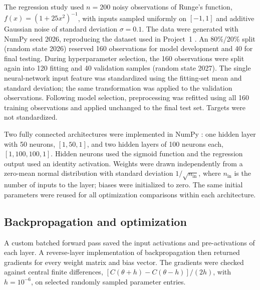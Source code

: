 \documentclass[aps,rmp,reprint,amsmath,amssymb,graphicx,longbibliography]{revtex4-1}
\begin{document}
The regression study used $n=200$ noisy observations of Runge's function,
$f(x)=(1+25x^2)^{-1}$, with inputs sampled uniformly on $[-1,1]$ and
additive Gaussian noise of standard deviation $\sigma=0.1$. The data
were generated with NumPy \cite{harris2020array} seed 2026, reproducing the dataset used in
Project~1 \cite{Project_1}. An 80\%/20\% split (random state 2026) reserved 160
observations for model development and 40 for final testing. During
hyperparameter selection, the 160 observations were split again into
120 fitting and 40 validation samples (random state 2027). The single
neural-network input feature was standardized using the fitting-set mean
and standard deviation; the same transformation was applied to the
validation observations. Following model selection, preprocessing was
refitted using all 160 training observations and applied unchanged to
the final test set. Targets were not standardized.

Two fully connected architectures were implemented in NumPy \cite{harris2020array}: one hidden
layer with 50 neurons, $[1,50,1]$, and two hidden layers of 100 neurons
each, $[1,100,100,1]$. Hidden neurons used the sigmoid function and the
regression output used an identity activation.
Weights were drawn independently from a zero-mean normal distribution
with standard deviation $1/\sqrt{n_{\mathrm{in}}}$, where
$n_{\mathrm{in}}$ is the number of inputs to the layer; biases were
initialized to zero. The same initial parameters were reused for all
optimization comparisons within each architecture.


\subsection{Backpropagation and optimization}
\label{subsec:partb_optimization}

A custom batched forward pass saved the input activations and
pre-activations of each layer. A reverse-layer implementation of
backpropagation then returned gradients for every weight matrix and
bias vector. The gradients were checked against central finite
differences, $[C(\theta+h)-C(\theta-h)]/(2h)$, with $h=10^{-6}$, on
selected randomly sampled parameter entries.
\end{document}
